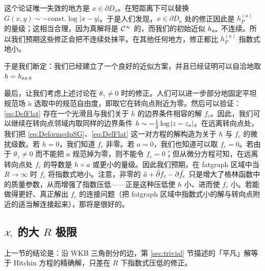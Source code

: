 这个论证唯一失效的地方是 $x\in\partial D_a$。在短距离下可以替换 $G(x,y)\sim-\mathrm{const.}\log|x-y|$。于是人们发现，$x\in\partial D_a$ 处的修正因此是 $h_P^{(a)}$ 的量级；这相当合理，因为真解将是 $\mathcal{C}^\infty$ 的，而我们的初始近似 $h_{\rm ax}$ 不连续。所以我们预期这些修正会把不连续处抹平。在其他任何地方，修正都比 $h_P^{(a)}$ 指数式地小。

于是我们断定：我们已经建立了一个良好的近似方案，并且已经证明可以自洽地取 $h=h_{\rm ax}$。

最后，让我们考虑上述讨论在 $\theta_\gamma\neq0$ 时的修正。人们可以进一步部分地固定平坦规范场 $\tilde a$ 选取中的规范自由度，即取它在转向点附近为零。然后可以验证：\eqref{eq:DefFlat} 存在一个光滑且与我们关于 $h$ 的边界条件相容的解 $f_c$。因此，我们可以继续在转向点邻域内取同样的边界条件 $h\sim-\tfrac{1}{2}\log|z-z_a|$。在远离转向点处，我们把 \eqref{eq:DeformedpSG}、\eqref{eq:DefFlat} 这一对方程的解构造为关于 $h$ 与 $f_c$ 的微扰级数。若 $h=0$，我们知道 $f_c$ 非零。若 $a=0$，我们也知道可以取 $f_c=0$。若由于 $\theta_\gamma\neq0$ 而不能把 $a$ 规范掉为零，则不能令 $f_c=0$；但从微分方程可知，在远离转向点处 $f_c$ 的导数是 $h\times a$ 或更小的量级。因此我们预期，在 fatgraph 区域中当 $R\to\infty$ 时 $f_c$ 将指数式地小。注意，非零的 $\tilde a+\bar\partial f_c-\partial\bar f_c$ 只是增大了格林函数中的质量参数，从而增强了指数压低——正是这种压低使 $h$ 小、进而使 $f_c$ 小。若能做得更好、真正解出 $f_c$ 的连接问题（把 fatgraph 区域中指数式小的解与转向点附近的适当解连接起来），那将是很好的。

\subsection{$\mathcal{X}_\gamma$ 的大 $R$ 极限}

上一节的结论是：沿 WKB 三角剖分的边，第 \ref{sec:trivial} 节描述的「平凡」解等于 Hitchin 方程的精确解，只差在 $R$ 下指数式压低的修正。

